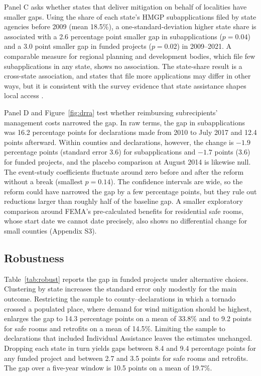 \documentclass[12pt]{article}
\begin{document}
Panel C asks whether states that deliver mitigation on behalf of localities have smaller gaps. Using the share of each state's HMGP subapplications filed by state agencies before 2009 (mean 18.5\%), a one-standard-deviation higher state share is associated with a 2.6 percentage point smaller gap in subapplications ($p = 0.04$) and a 3.0 point smaller gap in funded projects ($p = 0.02$) in 2009--2021. A comparable measure for regional planning and development bodies, which file few subapplications in any state, shows no association. The state-share result is a cross-state association, and states that file more applications may differ in other ways, but it is consistent with the survey evidence that state assistance shapes local access \parencite{smith2020state}.

Panel D and Figure~\ref{fig:drra} test whether reimbursing subrecipients' management costs narrowed the gap. In raw terms, the gap in subapplications was 16.2 percentage points for declarations made from 2010 to July 2017 and 12.4 points afterward. Within counties and declarations, however, the change is $-1.9$ percentage points (standard error 3.6) for subapplications and $-1.7$ points (3.6) for funded projects, and the placebo comparison at August 2014 is likewise null. The event-study coefficients fluctuate around zero before and after the reform without a break (smallest $p = 0.14$). The confidence intervals are wide, so the reform could have narrowed the gap by a few percentage points, but they rule out reductions larger than roughly half of the baseline gap. A smaller exploratory comparison around FEMA's pre-calculated benefits for residential safe rooms, whose start date we cannot date precisely, also shows no differential change for small counties (Appendix S3).

\subsection{Robustness}

Table~\ref{tab:robust} reports the gap in funded projects under alternative choices. Clustering by state increases the standard error only modestly for the main outcome. Restricting the sample to county--declarations in which a tornado crossed a populated place, where demand for wind mitigation should be highest, enlarges the gap to 14.3 percentage points on a mean of 33.8\% and to 9.2 points for safe rooms and retrofits on a mean of 14.5\%. Limiting the sample to declarations that included Individual Assistance leaves the estimates unchanged. Dropping each state in turn yields gaps between 8.4 and 9.4 percentage points for any funded project and between 2.7 and 3.5 points for safe rooms and retrofits. The gap over a five-year window is 10.5 points on a mean of 19.7\%.
\end{document}
